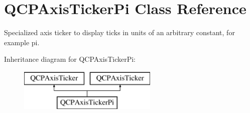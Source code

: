 \hypertarget{class_q_c_p_axis_ticker_pi}{}\section{Q\+C\+P\+Axis\+Ticker\+Pi Class Reference}
\label{class_q_c_p_axis_ticker_pi}


Specialized axis ticker to display ticks in units of an arbitrary constant, for example pi.  


Inheritance diagram for Q\+C\+P\+Axis\+Ticker\+Pi\+:\begin{figure}[H]
\begin{center}
\leavevmode
\includegraphics[height=2.000000cm]{class_q_c_p_axis_ticker_pi}
\end{center}
\end{figure}
